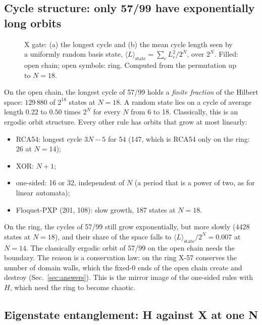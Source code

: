 \subsection{Cycle structure: only 57/99 have exponentially long orbits}
\begin{figure}[h]
\centering
{}
\caption{X gate: (a) the longest cycle and (b) the mean cycle length seen by a uniformly random basis state,
$\langle L\rangle_\mathrm{state}=\sum_c L_c^2/2^N$, over $2^N$. Filled: open chain; open symbols: ring. Computed from the
permutation up to $N=18$.}
\label{fig:xcycles}
\end{figure}
On the open chain, the longest cycle of 57/99 holds a \emph{finite fraction} of the Hilbert space: $129\,880$ of $2^{18}$
states at $N=18$. A random state lies on a cycle of average length $0.22$ to $0.50$ times $2^N$ for every $N$ from 6 to 18.
Classically, this is an ergodic orbit structure. Every other rule has orbits that grow at most linearly:
\begin{itemize}
\item RCA54: longest cycle $3N-5$ for 54 (147, which is RCA54 only on the ring: 26 at $N=14$);
\item XOR: $N+1$;
\item one-sided: 16 or 32, independent of $N$ (a period that is a power of two, as for linear automata);
\item Floquet-PXP (201, 108): slow growth, 187 states at $N=18$.
\end{itemize}
On the ring, the cycles of 57/99 still grow exponentially, but more slowly (4428 states at $N=18$), and their share of the
space falls to $\langle L\rangle_\mathrm{state}/2^N=0.007$ at $N=14$. The classically ergodic orbit of 57/99 on the open
chain needs the boundary. The reason is a conservation law: on the ring X-57 conserves the number of domain walls, which the
fixed-$0$ ends of the open chain create and destroy (Sec.~\ref{sec:answers}). This is the mirror image of the one-sided rules with $H$, which need the ring to become chaotic.

\subsection{Eigenstate entanglement: H against X at one N}
\begin{table}[h]
\centering\scriptsize

\caption{X gate at $N=14$, both boundaries: number of cycles, the longest, $\langle L\rangle_\mathrm{state}/2^N$, and the
mean half-chain entanglement of all eigenstates over the Page value ($\bar S_X$). $\bar S_H$ is the same mean for the H
gate, over its non-degenerate eigenstates (degenerate ones have basis-dependent entanglement).}
\label{tab:x}
\end{table}


